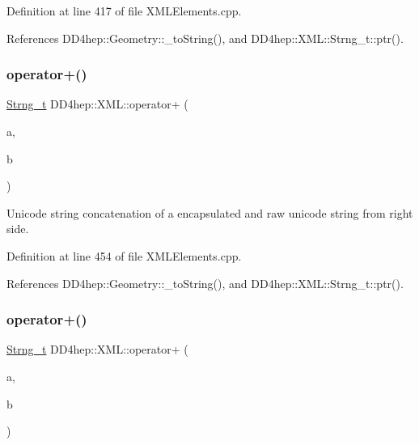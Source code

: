 Definition at line 417 of file X\+M\+L\+Elements.\+cpp.



References D\+D4hep\+::\+Geometry\+::\+\_\+to\+String(), and D\+D4hep\+::\+X\+M\+L\+::\+Strng\+\_\+t\+::ptr().

\hypertarget{group___d_d4_h_e_p___x_m_l_ga80dcfab5263e77bc2580f30c7d0e4f2e}{}\label{group___d_d4_h_e_p___x_m_l_ga80dcfab5263e77bc2580f30c7d0e4f2e} 
\subsubsection{\texorpdfstring{operator+()}{operator+()}\hspace{0.1cm}{\footnotesize\ttfamily [6/14]}}
{\footnotesize\ttfamily \hyperlink{class_d_d4hep_1_1_x_m_l_1_1_strng__t}{Strng\+\_\+t} D\+D4hep\+::\+X\+M\+L\+::operator+ (\begin{DoxyParamCaption}\item[{const \hyperlink{class_d_d4hep_1_1_x_m_l_1_1_strng__t}{Strng\+\_\+t} \&}]{a,  }\item[{const \hyperlink{namespace_d_d4hep_1_1_x_m_l_a09e5d9cc86ed782f6826dfe0778c1815}{Xml\+Char} $\ast$}]{b }\end{DoxyParamCaption})}



Unicode string concatenation of a encapsulated and raw unicode string from right side. 



Definition at line 454 of file X\+M\+L\+Elements.\+cpp.



References D\+D4hep\+::\+Geometry\+::\+\_\+to\+String(), and D\+D4hep\+::\+X\+M\+L\+::\+Strng\+\_\+t\+::ptr().

\hypertarget{group___d_d4_h_e_p___x_m_l_gafe9f9443003bbab38d67856960e62071}{}\label{group___d_d4_h_e_p___x_m_l_gafe9f9443003bbab38d67856960e62071} 
\subsubsection{\texorpdfstring{operator+()}{operator+()}\hspace{0.1cm}{\footnotesize\ttfamily [7/14]}}
{\footnotesize\ttfamily \hyperlink{class_d_d4hep_1_1_x_m_l_1_1_strng__t}{Strng\+\_\+t} D\+D4hep\+::\+X\+M\+L\+::operator+ (\begin{DoxyParamCaption}\item[{const \hyperlink{namespace_d_d4hep_1_1_x_m_l_a09e5d9cc86ed782f6826dfe0778c1815}{Xml\+Char} $\ast$}]{a,  }\item[{const \hyperlink{class_d_d4hep_1_1_x_m_l_1_1_strng__t}{Strng\+\_\+t} \&}]{b }\end{DoxyParamCaption})}



